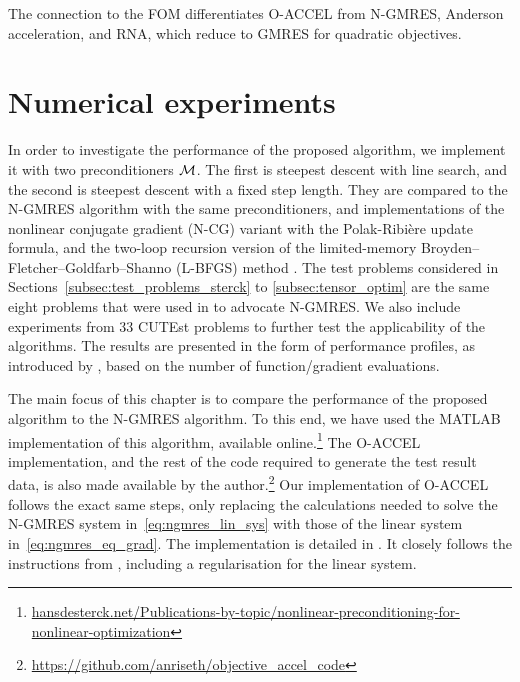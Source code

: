 \documentclass[main.tex]{subfiles}
\begin{document}
\begin{remark}
  The connection to the FOM differentiates O-ACCEL from N-GMRES,
  Anderson acceleration, and RNA, which reduce to GMRES for quadratic
  objectives.
\end{remark}


\section{Numerical experiments}\label{sec:num_experiments}
In order to investigate the performance of the proposed algorithm, we
implement it with two preconditioners $\mathcal{M}$. The first is steepest
descent with line search, and the second is steepest descent with a
fixed step length.  They are compared to the N-GMRES algorithm with
the same preconditioners, and implementations of the nonlinear
conjugate gradient (N-CG) variant with the Polak-Ribi\`{e}re update
formula, and the two-loop recursion version of the limited-memory
Broyden--Fletcher--Goldfarb--Shanno (L-BFGS) method
\citep{nocedal2006numerical}.  The test problems considered in
Sections~\ref{subsec:test_problems_sterck} to
\ref{subsec:tensor_optim} are the same eight problems that were used
in \citet{sterck2013steepest} to advocate N-GMRES. We also include
experiments from \num{33} CUTEst problems to further test the
applicability of the algorithms.  The results are presented in the
form of performance profiles, as introduced by
\citet{dolan2002benchmarking}, based on the number of
function/gradient evaluations.

The main focus of this chapter is to compare the performance of the
proposed algorithm to the N-GMRES algorithm. To this end, we have used
the MATLAB implementation of this algorithm, available
online.\footnote{\href{http://www.hansdesterck.net/Publications-by-topic/nonlinear-preconditioning-for-nonlinear-optimization}
  {hansdesterck.net/Publications-by-topic/nonlinear-preconditioning-for-nonlinear-optimization}}
The O-ACCEL implementation, and the rest of the code required to
generate the test result data, is also made available by the
author.\footnote{\url{https://github.com/anriseth/objective_accel_code}}
Our implementation of O-ACCEL follows the exact same steps, only
replacing the calculations needed to solve the N-GMRES system
in~\eqref{eq:ngmres_lin_sys} with those of the linear system
in~\eqref{eq:ngmres_eq_grad}.  The implementation is detailed in
. It closely follows the instructions from
\citet{washio1997krylov}, including a regularisation for the linear
system.
\end{document}
